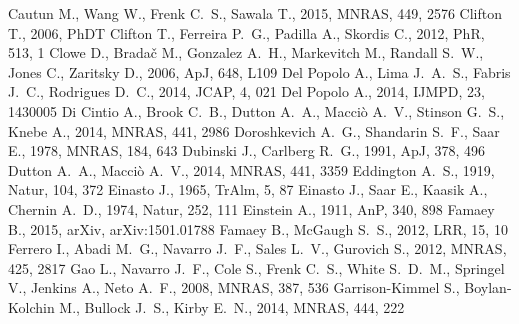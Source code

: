 \documentclass[a4wide,12pt]{book}
\begin{document}
{\begin{thebibliography}{}
Cautun M., Wang W., Frenk C.~S., Sawala T., 2015, MNRAS, 449, 2576
Clifton T., 2006, PhDT
 Clifton T., Ferreira P.~G., Padilla A., 
Skordis C., 2012, PhR, 513, 1  
Clowe D., Brada{\v c} M., Gonzalez A.~H., Markevitch M., Randall S.~W., 
Jones C., Zaritsky D., 2006, ApJ, 648, L109
 Del Popolo A., Lima J.~A.~S., Fabris 
J.~C., Rodrigues D.~C., 2014, JCAP, 4, 021 
Del Popolo A., 2014, IJMPD, 23, 1430005  
 Di Cintio A., Brook C.~B., Dutton A.~A., 
Macci{\`o} A.~V., Stinson G.~S., Knebe A., 2014, MNRAS, 441, 2986 
 Doroshkevich A.~G., Shandarin S.~F., Saar E., 1978, MNRAS, 184, 643 
 Dubinski J., Carlberg R.~G., 1991, ApJ, 378, 496 
 Dutton A.~A., Macci{\`o} A.~V., 2014, MNRAS, 441, 3359 
Eddington A.~S., 1919, Natur, 104, 372
Einasto J., 1965, TrAlm, 5, 87
 Einasto J., Saar E., Kaasik A., Chernin 
A.~D., 1974, Natur, 252, 111 
Einstein A., 1911, AnP, 340, 898 
 Famaey 
B., 2015, arXiv, arXiv:1501.01788 
 Famaey B., McGaugh S.~S., 2012, LRR, 15, 10 
 Ferrero I., Abadi M.~G., Navarro J.~F., 
Sales L.~V., Gurovich S., 2012, MNRAS, 425, 2817
Gao L., Navarro J.~F., Cole S., Frenk C.~S., White S.~D.~M., Springel V., 
Jenkins A., Neto A.~F., 2008, MNRAS, 387, 536
 Garrison-Kimmel S., Boylan-Kolchin M., 
Bullock J.~S., Kirby E.~N., 2014, MNRAS, 444, 222  

\end{thebibliography}}
\end{document}
